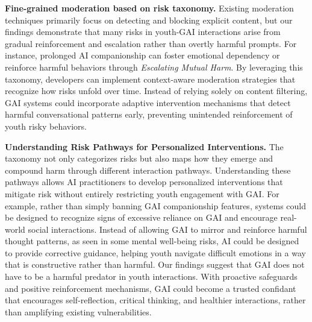 \textbf{Fine-grained moderation based on risk taxonomy.}  Existing moderation techniques primarily focus on detecting and blocking explicit content, but our findings demonstrate that many risks in youth-GAI interactions arise from gradual reinforcement and escalation rather than overtly harmful prompts. For instance, prolonged AI companionship can foster emotional dependency or reinforce harmful behaviors through \textit{Escalating Mutual Harm}. By leveraging this taxonomy, developers can implement context-aware moderation strategies that recognize how risks unfold over time. Instead of relying solely on content filtering, GAI systems could incorporate adaptive intervention mechanisms that detect harmful conversational patterns early, preventing unintended reinforcement of youth risky behaviors.

\textbf{Understanding Risk Pathways for Personalized Interventions.}  The taxonomy not only categorizes risks but also maps how they emerge and compound harm through different interaction pathways. Understanding these pathways allows AI practitioners to develop personalized interventions that mitigate risk without entirely restricting youth engagement with GAI. For example, rather than simply banning GAI companionship features, systems could be designed to recognize signs of excessive reliance on GAI and encourage real-world social interactions. Instead of allowing GAI to mirror and reinforce harmful thought patterns, as seen in some mental well-being risks, AI could be designed to provide corrective guidance, helping youth navigate difficult emotions in a way that is constructive rather than harmful. Our findings suggest that GAI does not have to be a harmful predator in youth interactions. With proactive safeguards and positive reinforcement mechanisms, GAI could become a trusted confidant that encourages self-reflection, critical thinking, and healthier interactions, rather than amplifying existing vulnerabilities.

